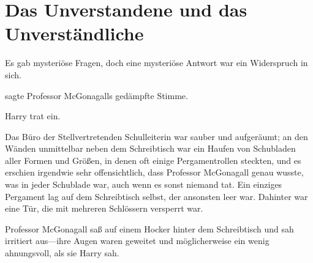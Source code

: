 \chapter{Das Unverstandene und das Unverständliche}

\begin{chapterOpeningQuote}
Es gab mysteriöse Fragen, doch eine mysteriöse Antwort war ein Widerspruch in sich.
\end{chapterOpeningQuote}

 sagte Professor McGonagalls gedämpfte Stimme.

\hplettrineextrapara
Harry trat ein.

Das Büro der Stellvertretenden Schulleiterin war sauber und aufgeräumt; an den Wänden unmittelbar neben dem Schreibtisch war ein Haufen von Schubladen aller Formen und Größen, in denen oft einige Pergamentrollen steckten, und es erschien irgendwie sehr offensichtlich, dass Professor McGonagall genau wusste, was in jeder Schublade war, auch wenn es sonst niemand tat. Ein einziges Pergament lag auf dem Schreibtisch selbst, der ansonsten leer war. Dahinter war eine Tür, die mit mehreren Schlössern versperrt war.

Professor McGonagall saß auf einem Hocker hinter dem Schreibtisch und sah irritiert aus—ihre Augen waren geweitet und möglicherweise ein wenig ahnungsvoll, als sie Harry sah.

